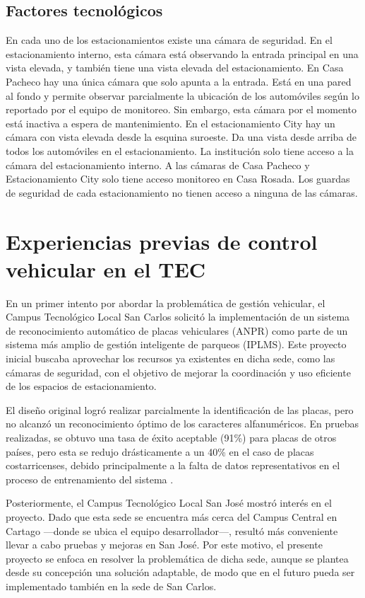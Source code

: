 \subsection{Factores tecnológicos}
En cada uno de los estacionamientos existe una cámara de seguridad. En el estacionamiento interno,
esta cámara está observando la entrada principal en una vista elevada, y también tiene una vista elevada del estacionamiento. 
En Casa Pacheco hay una única cámara que solo apunta a la entrada. Está en una pared al fondo y permite 
observar parcialmente la ubicación de los automóviles según lo reportado por el equipo de monitoreo.
Sin embargo, esta cámara por el momento está inactiva a espera de mantenimiento.
En el estacionamiento City hay un cámara con vista elevada desde la esquina suroeste. Da una vista desde arriba de todos
los automóviles en el estacionamiento. La institución solo tiene acceso a la
cámara del estacionamiento interno. A las cámaras de Casa Pacheco y Estacionamiento City solo tiene acceso 
monitoreo en Casa Rosada. Los guardas de seguridad de cada estacionamiento no tienen acceso a ninguna de las cámaras.

\section{Experiencias previas de control vehicular en el TEC}
En un primer intento por abordar la problemática de gestión vehicular,
el Campus Tecnológico Local San Carlos solicitó la implementación de un sistema de reconocimiento automático
de placas vehiculares (ANPR) como parte de un sistema más amplio de gestión inteligente de parqueos (IPLMS).
Este proyecto inicial buscaba aprovechar los recursos ya existentes en dicha sede, como las cámaras de seguridad,
con el objetivo de mejorar la coordinación y uso eficiente de los espacios de estacionamiento.

El diseño original logró realizar parcialmente la identificación de las placas,
pero no alcanzó un reconocimiento óptimo de los caracteres alfanuméricos.
En pruebas realizadas, se obtuvo una tasa de éxito aceptable (91\%) para placas de otros países,
pero esta se redujo drásticamente a un 40\% en el caso de placas costarricenses,
debido principalmente a la falta de datos representativos en el proceso de entrenamiento del sistema \cite{proyecto_previo}.

Posteriormente, el Campus Tecnológico Local San José mostró interés en el proyecto.
Dado que esta sede se encuentra más cerca del Campus Central en Cartago —donde se ubica el equipo desarrollador—, 
resultó más conveniente llevar a cabo pruebas y mejoras en San José.
Por este motivo, el presente proyecto se enfoca en resolver la problemática de dicha sede,
aunque se plantea desde su concepción una solución adaptable,
de modo que en el futuro pueda ser implementado también en la sede de San Carlos.

